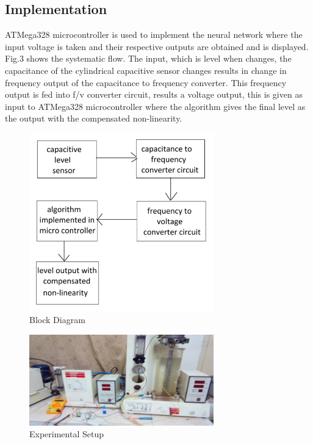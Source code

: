 \documentclass[conference]{IEEEtran}
\begin{document}
\subsection{Implementation}
ATMega328 microcontroller is used to implement the neural network where the input voltage is taken and their respective outputs are obtained and is displayed. Fig.3 shows the systematic flow. The input, which is level when changes, the capacitance of the cylindrical capacitive sensor changes results in change in frequency output of the capacitance to frequency converter. This frequency output is fed into f/v converter circuit, results a voltage output, this is given as input to ATMega328 microcontroller where the algorithm gives the final level as the output with the compensated non-linearity. \\
\begin{figure}[h]
\includegraphics[width=8cm]{blockdiagram.png}
\centering
\caption{Block Diagram}\label{block_diagram_img}
\end{figure}
\begin{figure}[h]
\includegraphics[width=8cm]{setup.png}
\centering
\caption{Experimental Setup}\label{setup_img}
\end{figure}
\end{document}
